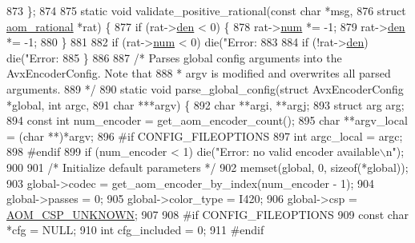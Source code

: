 \begin{DoxyCodeInclude}
{{{{{{{{{873 \};
874 
875 \textcolor{keyword}{static} \textcolor{keywordtype}{void} validate\_positive\_rational(\textcolor{keyword}{const} \textcolor{keywordtype}{char} *msg,
876     \textcolor{keyword}{struct} \hyperlink{structaom__rational}{aom\_rational} *rat) \{
877   \textcolor{keywordflow}{if} (rat->\hyperlink{structaom__rational_adeddf2ea01c12b7be66536e0a0fb92c5}{den} < 0) \{
878     rat->\hyperlink{structaom__rational_a7b48174411798c780a15f132c4650839}{num} *= -1;
879     rat->\hyperlink{structaom__rational_adeddf2ea01c12b7be66536e0a0fb92c5}{den} *= -1;
880   \}
881 
882   \textcolor{keywordflow}{if} (rat->\hyperlink{structaom__rational_a7b48174411798c780a15f132c4650839}{num} < 0) die(\textcolor{stringliteral}{"Error: %
883 
884   \textcolor{keywordflow}{if} (!rat->\hyperlink{structaom__rational_adeddf2ea01c12b7be66536e0a0fb92c5}{den}) die(\textcolor{stringliteral}{"Error: %
885 \}
886 
887 \textcolor{comment}{/* Parses global config arguments into the AvxEncoderConfig. Note that}
888 \textcolor{comment}{ * argv is modified and overwrites all parsed arguments.}
889 \textcolor{comment}{ */}
890 \textcolor{keyword}{static} \textcolor{keywordtype}{void} parse\_global\_config(\textcolor{keyword}{struct} AvxEncoderConfig *global, \textcolor{keywordtype}{int} argc,
891     \textcolor{keywordtype}{char} ***argv) \{
892   \textcolor{keywordtype}{char} **argi, **argj;
893   \textcolor{keyword}{struct }arg arg;
894   \textcolor{keyword}{const} \textcolor{keywordtype}{int} num\_encoder = get\_aom\_encoder\_count();
895   \textcolor{keywordtype}{char} **argv\_local = (\textcolor{keywordtype}{char} **)*argv;
896 \textcolor{preprocessor}{#if CONFIG\_FILEOPTIONS}
897   \textcolor{keywordtype}{int} argc\_local = argc;
898 \textcolor{preprocessor}{#endif}
899   \textcolor{keywordflow}{if} (num\_encoder < 1) die(\textcolor{stringliteral}{"Error: no valid encoder available\(\backslash\)n"});
900 
901   \textcolor{comment}{/* Initialize default parameters */}
902   memset(global, 0, \textcolor{keyword}{sizeof}(*global));
903   global->codec = get\_aom\_encoder\_by\_index(num\_encoder - 1);
904   global->passes = 0;
905   global->color\_type = I420;
906   global->csp = \hyperlink{aom__image_8h_a10590253ef3dbde7e93ed5d4b4e0e73ba7843506f3e28f720be0d4f03237fb48c}{AOM\_CSP\_UNKNOWN};
907 
908 \textcolor{preprocessor}{#if CONFIG\_FILEOPTIONS}
909   \textcolor{keyword}{const} \textcolor{keywordtype}{char} *cfg = NULL;
910   \textcolor{keywordtype}{int} cfg\_included = 0;
911 \textcolor{preprocessor}{#endif}
}}}}}}}}}}}
\end{DoxyCodeInclude}
